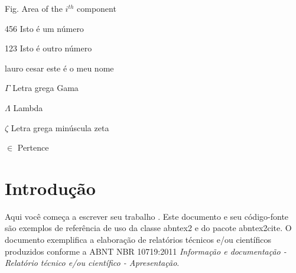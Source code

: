 \documentclass[
12pt,				%
oneside,			%
a4paper,			%
english,			%
french,				%
spanish,			%
brazil,				%
]{abntex2}
\begin{document}

\listoffigures* %
\cleardoublepage %


\listoftables*
\cleardoublepage

\begin{siglas}
\item[Fig.] Area of the $i^{th}$ component
\item[456] Isto é um número
\item[123] Isto é outro número
\item[lauro cesar] este é o meu nome
\end{siglas}

\begin{simbolos}
\item[$ \Gamma $] Letra grega Gama
\item[$ \Lambda $] Lambda
\item[$ \zeta $] Letra grega minúscula zeta
\item[$ \in $] Pertence
\end{simbolos}


\tableofcontents*


\textual


\chapter{Introdução} %

Aqui você começa a escrever seu trabalho \cite{fulano}. Este documento e seu código-fonte são exemplos de referência de uso da classe
\textsf{abntex2} e do pacote \textsf{abntex2cite}. O documento 
exemplifica a elaboração de relatórios técnicos e/ou científicos produzidos
conforme a ABNT NBR 10719:2011 \textit{Informação e documentação - Relatório
técnico e/ou científico - Apresentação}.
\end{document}

